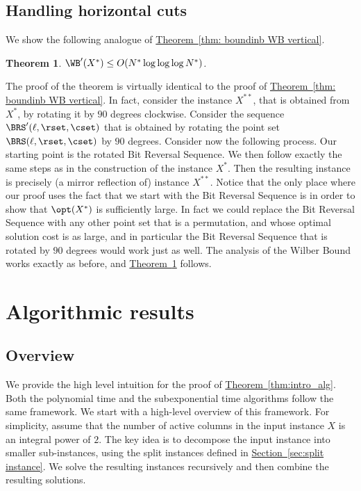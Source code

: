 \documentclass[11pt]{article}
\numberwithin{equation}{section}
\newtheorem{theorem}{Theorem}[section]
\theoremstyle{definition}
\theoremstyle{plain}
\newcommand{\expref}[2]{\hyperref[#2]{#1~\ref{#2}}}
\begin{document}
%
%
%
%
\subsection{Handling horizontal cuts}\label{subsec: bounding WB horizontal}
%
%
%
%
We show the following analogue of \expref{Theorem}{thm: boundinb WB vertical}.

\begin{theorem}\label{thm: boundinb WB horizontal}
	$\WB'(X^*)\leq O(N^*\log\log\log N^*)$.
\end{theorem}

The proof of the theorem is virtually identical to the proof of \expref{Theorem}{thm: boundinb WB vertical}. 
In fact, consider the instance $X^{**}$, that is obtained from $X^*$, by rotating it by $90$ degrees clockwise.
Consider the sequence $\BRS'(\ell, \rset, \cset)$ that is obtained by rotating the point set $\BRS(\ell, \rset, \cset)$ by $90$ degrees.  
%
Consider now the following process. Our starting point is the rotated Bit Reversal Sequence. We then follow exactly the same steps as in the construction of the instance $X^*$. 
Then the resulting instance is precisely (a mirror reflection of) instance $X^{**}$.
Notice that the only place where our proof uses the fact that we start with the Bit Reversal Sequence is in order to show that $\opt(X^*)$ is sufficiently large. In fact we could replace the Bit Reversal Sequence with any other point set that is a permutation, and whose optimal solution cost is as large, and in particular the Bit Reversal Sequence that is rotated by $90$ degrees would work just as well. The analysis of the Wilber Bound works exactly as before, and \expref{Theorem}{thm: boundinb WB horizontal} follows.




%


\section{Algorithmic results} 
\label{sec: algo} 
\newcommand{\pedit}[1]{\textcolor{red}{#1}}

\subsection{Overview} 

We provide the high level intuition for the proof of \expref{Theorem}{thm:intro_alg}. Both the polynomial time and the subexponential time algorithms follow the same framework. We start with a high-level overview of this framework. For simplicity, assume that the number of active columns in the input instance $X$ is an integral power of $2$.
The key idea is to decompose the input instance into smaller sub-instances,  using the split instances defined in \expref{Section}{sec:split instance}. We solve the resulting instances recursively and then combine the resulting solutions.
\end{document}
